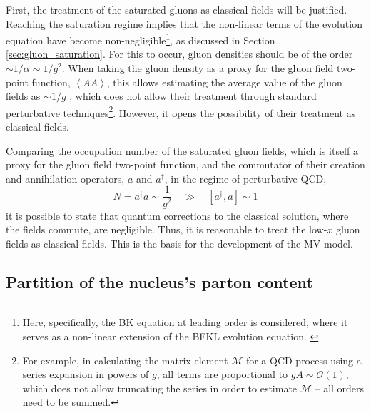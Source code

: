 First, the treatment of the saturated gluons as classical fields will be justified. Reaching the saturation regime implies that the non-linear terms of the evolution equation have become non-negligible\footnote{Here, specifically, the \gls{BK} equation at leading order is considered, where it serves as a non-linear extension of the \gls{BFKL} evolution equation. \cite{Albacete_2014}}, as discussed in Section \ref{sec:gluon_saturation}. For this to occur, gluon densities should be of the order $\sim 1/\alpha \sim 1/g^2$. When taking the gluon density as a proxy for the gluon field two-point function, $\left< AA \right>$, this allows estimating the average value of the gluon fields as $\sim 1/g$
, which does not allow their treatment through standard perturbative techniques\footnote{For example, in calculating the matrix element $\mathcal{M}$ for a \gls{QCD} process using a series expansion in powers of $g$, all terms are proportional to $gA \sim \mathcal{O}(1)$, which does not allow truncating the series in order to estimate $\mathcal{M}$ -- all orders need to be summed.}. \cite{Albacete_2014} However, it opens the possibility of their treatment as classical fields.

Comparing the occupation number of the saturated gluon fields, which is itself a proxy for the gluon field two-point function, and the commutator of their creation and annihilation operators, $a$ and $a^\dagger$, \citep{Albacete_2014} in the regime of perturbative \gls{QCD},
\begin{equation}
	N = a^\dagger a \sim \frac{1}{g^2} \quad \gg \quad [a^\dagger, a] \sim 1
\end{equation}
it is possible to state that quantum corrections to the classical solution, where the fields commute, are negligible. Thus, it is reasonable to treat the low-$x$ gluon fields as classical fields. This is the basis for the development of the \gls{MV} model.

\subsection{Partition of the nucleus's parton content} \label{sec:scale_separation}

